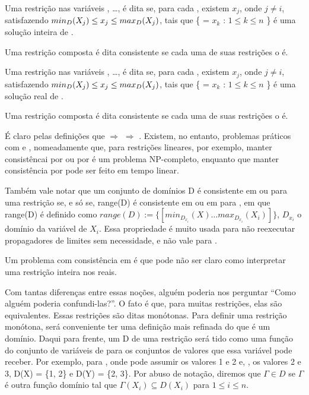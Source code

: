 \documentclass{article}
\begin{document}
\begin{definition}
  Uma restrição  nas variáveis , \dots,  é dita
  se, para cada , existem  $x_j$, onde $j \neq i$,
  satisfazendo $min_D(\textit{$X_j$}) \leq x_j \leq max_D(\textit{$X_j$})$,
  tais que \{ = $x_k$ : $1 \leq k \leq n$ \}
  é uma solução inteira de .

  Uma restrição composta é dita \boundz{} consistente se cada uma de suas restrições o é.
\end{definition}

\begin{definition}
  Uma restrição  nas variáveis , \dots,  é dita
  se, para cada , existem  $x_j$, onde $j \neq i$,
  satisfazendo $min_D(\textit{$X_j$}) \leq x_j \leq max_D(\textit{$X_j$})$,
  tais que \{ = $x_k$ : $1 \leq k \leq n$ \}
  é uma solução real de .

  Uma restrição composta é dita \boundr{} consistente se cada uma de suas restrições o é.
\end{definition}

É claro pelas definições que \boundd{} $\Rightarrow$ \boundz{} $\Rightarrow$ \boundr. Existem, no
entanto, problemas práticos com \boundd{} e \boundz, nomeadamente que, para restrições lineares, por
exemplo, manter consistêncai por \boundd{} ou por \boundz{} é um problema NP-completo, enquanto que
manter consistência por \boundr{} pode ser feito em tempo linear.

Também vale notar que um conjunto de domínios D é consistente em \boundz{} ou \boundr{} para uma
restrição  se, e só se, range(D) é consistente em \boundz{} ou em \boundr{} para
, em que range(D) é definido como $range(D) := \{[min_D_x_i(X) \ldots  max_D_x_i(X_i)]\}$, $D_x_i$ o domínio da
variável de  $X_i$. Essa propriedade é muito usada para não reexecutar propagadores
de limites sem necessidade, e não vale para \boundd{}.

Um problema com consistência em \boundr{} é que pode não ser claro como interpretar uma restrição
inteira nos reais.

Com tantas diferenças entre essas noções, alguém poderia nos perguntar ``Como alguém poderia
confundi-las?''. O fato é que, para muitas restrições, elas são equivalentes. Essas restrições são
ditas monótonas. Para definir uma restrição monótona, será conveniente ter uma definição mais
refinada do que é um domínio. Daqui para frente, um  D de uma restrição
 será tido como uma função do conjunto de variáveis de  para os conjuntos de
valores que essa variável pode receber. Por exemplo, para , onde 
pode assumir os valores 1 e 2 e, , os valores 2 e 3, D(X) = \{1, 2\} e D(Y) = \{2, 3\}. Por
abuso de notação, diremos que $\Gamma \in D$ se $\Gamma$ é outra função domínio tal que $\Gamma(X_i)
\subseteq D(X_i)$ para $1 \leq i \leq n$.
\end{document}
